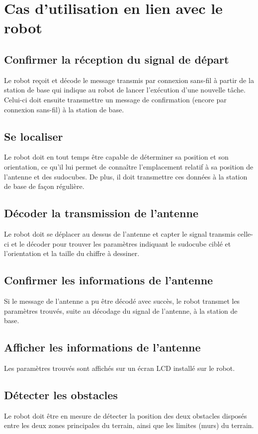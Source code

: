 \section{Cas d'utilisation en lien avec le robot}
\subsection{Confirmer la réception du signal de départ}
Le robot reçoit et décode le message transmis par connexion sans-fil à partir de la station de base qui indique au robot de lancer l'exécution d'une nouvelle tâche. Celui-ci doit ensuite transmettre un message de confirmation (encore par connexion sans-fil) à la station de base.
\subsection{Se localiser}
Le robot doit en tout temps être capable de déterminer sa position et son orientation, ce qu'il lui permet de connaître l'emplacement relatif à sa position de l'antenne et des sudocubes. De plus, il doit transmettre ces données à la station de base de façon régulière.
\subsection{Décoder la transmission de l'antenne}
Le robot doit se déplacer au dessus de l'antenne et capter le signal transmis celle-ci et le décoder pour trouver les paramètres indiquant le sudocube ciblé et l'orientation et la taille du chiffre à dessiner. 
\subsection{Confirmer les informations de l'antenne}
Si le message de l'antenne a pu être décodé avec succès, le robot transmet les paramètres trouvés, suite au décodage du signal de l'antenne, à la station de base.
\subsection{Afficher les informations de l'antenne}
Les paramètres trouvés sont affichés sur un écran LCD installé sur le robot.
\subsection{Détecter les obstacles}
Le robot doit être en mesure de détecter la position des deux obstacles disposés entre les deux zones principales du terrain, ainsi que les limites (murs) du terrain.

